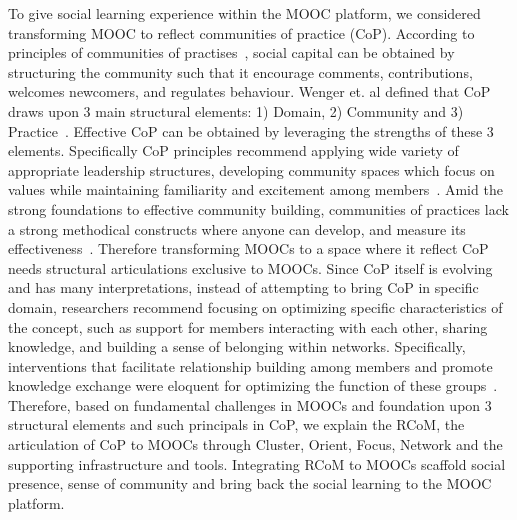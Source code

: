 \documentclass[format=acmsmall, review=false, screen=true]{acmart}
\begin{document}
To give social learning experience within the MOOC platform, we considered transforming MOOC to reflect communities of practice (CoP). According to principles of communities of practises~\cite{wenger2002seven}, social capital can be obtained by structuring the community such that it encourage comments, contributions, welcomes newcomers, and regulates behaviour. Wenger et. al defined that CoP draws upon 3 main structural elements: 1) Domain, 2) Community and 3) Practice~\cite{wenger2002cultivating}. Effective CoP can be obtained by leveraging the strengths of these 3 elements. Specifically CoP principles recommend applying wide variety of appropriate leadership structures, developing community spaces which focus on values while maintaining familiarity and excitement among members~\cite{wenger2002cultivating}. Amid the strong foundations to effective community building, communities of practices lack a strong methodical constructs where anyone can develop, and measure its effectiveness~\cite{li2009evolution}. Therefore transforming MOOCs to a space where it reflect CoP needs structural articulations exclusive to MOOCs. Since CoP itself is evolving and has many interpretations, instead of attempting to bring CoP in specific domain, researchers recommend focusing on optimizing specific characteristics of the concept, such as support for members interacting with each other, sharing knowledge, and building a sense of belonging within networks. Specifically, interventions that facilitate relationship building among members and promote knowledge exchange were eloquent for optimizing the function of these groups~\cite{li2009evolution}. Therefore, based on fundamental challenges in MOOCs and foundation upon 3 structural elements and such principals in CoP, we explain the RCoM, the articulation of CoP to MOOCs through Cluster, Orient, Focus, Network and the supporting infrastructure and tools. Integrating RCoM to MOOCs scaffold social presence, sense of community and bring back the social learning to the MOOC platform. 
\end{document}
